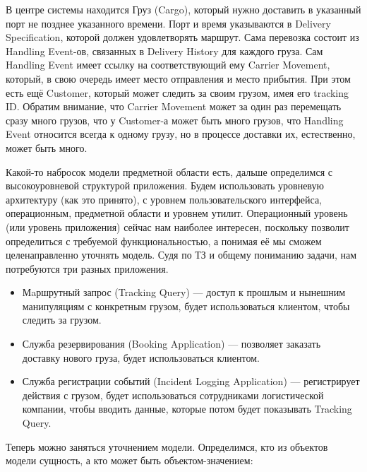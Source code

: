 \documentclass[a5paper]{article}
\begin{document}
В центре системы находится Груз (Cargo), который нужно доставить в указанный порт не позднее указанного времени. Порт и время указываются в Delivery Specification, которой должен удовлетворять маршрут. Сама перевозка состоит из Handling Event-ов, связанных в Delivery History для каждого груза. Сам Handling Event имеет ссылку на соответствующий ему Carrier Movement, который, в свою очередь имеет место отправления и место прибытия. При этом есть ещё Customer, который может следить за своим грузом, имея его tracking ID. Обратим внимание, что Carrier Movement может за один раз перемещать сразу много грузов, что у Customer-а может быть много грузов, что Handling Event относится всегда к одному грузу, но в процессе доставки их, естественно, может быть много.

Какой-то набросок модели предметной области есть, дальше определимся с высокоуровневой структурой приложения. Будем использовать уровневую архитектуру (как это принято), с уровнем пользовательского интерфейса, операционным, предметной области и уровнем утилит. Операционный уровень (или уровень приложения) сейчас нам наиболее интересен, поскольку позволит определиться с требуемой функциональностью, а понимая её мы сможем целенаправленно уточнять модель. Судя по ТЗ и общему пониманию задачи, нам потребуются три разных приложения.

\begin{itemize}
    \item Мaршрутный запрос (Tracking Query) --- доступ к прошлым и нынешним манипуляциям с конкретным грузом, будет использоваться клиентом, чтобы следить за грузом.
    \item Служба резервирования (Booking Application) --- позволяет заказать доставку нового груза, будет использоваться клиентом.
    \item Служба регистрации событий (Incident Logging Application) --- регистрирует действия с грузом, будет использоваться сотрудниками логистической компании, чтобы вводить данные, которые потом будет показывать Tracking Query.
\end{itemize}

Теперь можно заняться уточнением модели. Определимся, кто из объектов модели сущность, а кто может быть объектом-значением:
\end{document}

